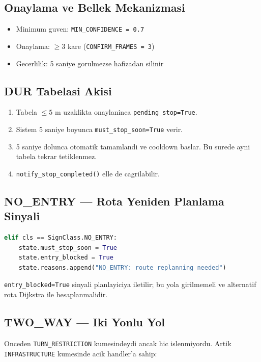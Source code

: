 \documentclass[a4paper,12pt]{article}
\begin{document}
\subsection{Onaylama ve Bellek Mekanizmasi}

\begin{itemize}
  \item Minimum guven: \texttt{MIN\_CONFIDENCE = 0.7}
  \item Onaylama: $\geq 3$ kare (\texttt{CONFIRM\_FRAMES = 3})
  \item Gecerlilik: 5 saniye gorulmezse hafizadan silinir
\end{itemize}

\subsection{DUR Tabelasi Akisi}

\begin{enumerate}
  \item Tabela $\leq 5$ m uzaklikta onaylaninca \texttt{pending\_stop=True}.
  \item Sistem 5 saniye boyunca \texttt{must\_stop\_soon=True} verir.
  \item 5 saniye dolunca otomatik tamamlandi ve cooldown baslar.
        Bu surede ayni tabela tekrar tetiklenmez.
  \item \texttt{notify\_stop\_completed()} elle de cagrilabilir.
\end{enumerate}

\subsection{NO\_ENTRY --- Rota Yeniden Planlama Sinyali}

\begin{lstlisting}[language=Python]
elif cls == SignClass.NO_ENTRY:
    state.must_stop_soon = True
    state.entry_blocked = True
    state.reasons.append("NO_ENTRY: route replanning needed")
\end{lstlisting}

\texttt{entry\_blocked=True} sinyali planlayiciya iletilir; bu yola girilmemeli
ve alternatif rota Dijkstra ile hesaplanmalidir.

\subsection{TWO\_WAY --- Iki Yonlu Yol}

Onceden \texttt{TURN\_RESTRICTION} kumesindeydi ancak hic islenmiyordu.
Artik \texttt{INFRASTRUCTURE} kumesinde acik handler'a sahip:
\end{document}
